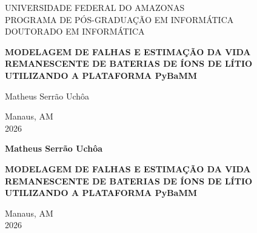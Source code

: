 \documentclass[
    12pt,
    openright,
    twoside,
    a4paper,
    brazil,
    english
]{abntex2}
\begin{document}
\pretextual

\begin{capa}
  \center
  \ABNTEXchapterfont\large UNIVERSIDADE FEDERAL DO AMAZONAS\\
  PROGRAMA DE PÓS-GRADUAÇÃO EM INFORMÁTICA\\
  DOUTORADO EM INFORMÁTICA

  \vspace*{4cm}

  {\ABNTEXchapterfont\bfseries\LARGE
  MODELAGEM DE FALHAS E ESTIMAÇÃO DA VIDA\\
  REMANESCENTE DE BATERIAS DE ÍONS DE LÍTIO\\
  UTILIZANDO A PLATAFORMA PyBaMM}

  \vspace*{4cm}

  {\Large Matheus Serr\~ao Uch\^oa}

  \vfill

  {\large Manaus, AM\\2026}
\end{capa}

\begin{folhaderosto}
  \begin{center}
    {\ABNTEXchapterfont\bfseries\large Matheus Serr\~ao Uch\^oa}

    \vspace*{3cm}

    {\ABNTEXchapterfont\bfseries\Large
    MODELAGEM DE FALHAS E ESTIMAÇÃO DA VIDA\\
    REMANESCENTE DE BATERIAS DE ÍONS DE LÍTIO\\
    UTILIZANDO A PLATAFORMA PyBaMM}

    \vspace*{2cm}

    \makeatletter
    \makeatother

    \vfill

    {\large Manaus, AM\\2026}
  \end{center}
\end{folhaderosto}
\end{document}
